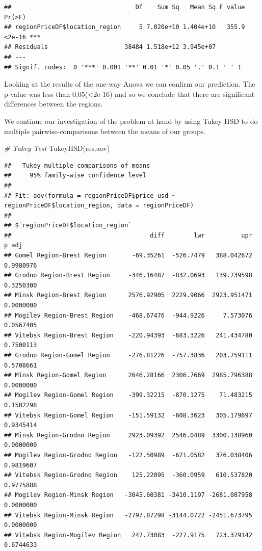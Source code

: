 \documentclass[
]{article}
\newenvironment{Shaded}{\begin{snugshade}}{\end{snugshade}}
\newcommand{\CommentTok}[1]{\textcolor[rgb]{0.56,0.35,0.01}{\textit{#1}}}
\newcommand{\FunctionTok}[1]{\textcolor[rgb]{0.00,0.00,0.00}{#1}}
\newcommand{\NormalTok}[1]{#1}
\begin{document}
\begin{verbatim}
##                                  Df    Sum Sq   Mean Sq F value Pr(>F)    
## regionPriceDF$location_region     5 7.020e+10 1.404e+10   355.9 <2e-16 ***
## Residuals                     38484 1.518e+12 3.945e+07                   
## ---
## Signif. codes:  0 '***' 0.001 '**' 0.01 '*' 0.05 '.' 0.1 ' ' 1
\end{verbatim}

Looking at the results of the one-way Anova we can confirm our
prediction. The p-value was less than 0.05(\textless2e-16) and so we
conclude that there are significant differences between the regions.

We continue our investigation of the problem at hand by using Tukey HSD
to do multiple pairwise-comparisons between the means of our groups.

\begin{Shaded}
\begin{Highlighting}[]
\CommentTok{\# Tukey Test}
\FunctionTok{TukeyHSD}\NormalTok{(res.aov)}
\end{Highlighting}
\end{Shaded}

\begin{verbatim}
##   Tukey multiple comparisons of means
##     95% family-wise confidence level
## 
## Fit: aov(formula = regionPriceDF$price_usd ~ regionPriceDF$location_region, data = regionPriceDF)
## 
## $`regionPriceDF$location_region`
##                                      diff        lwr          upr     p adj
## Gomel Region-Brest Region       -69.35261  -526.7479   388.042672 0.9980976
## Grodno Region-Brest Region     -346.16487  -832.0693   139.739598 0.3250300
## Minsk Region-Brest Region      2576.92905  2229.9066  2923.951471 0.0000000
## Mogilev Region-Brest Region    -468.67476  -944.9226     7.573076 0.0567405
## Vitebsk Region-Brest Region    -220.94393  -683.3226   241.434780 0.7500113
## Grodno Region-Gomel Region     -276.81226  -757.3836   203.759111 0.5708661
## Minsk Region-Gomel Region      2646.28166  2306.7669  2985.796388 0.0000000
## Mogilev Region-Gomel Region    -399.32215  -870.1275    71.483215 0.1502298
## Vitebsk Region-Gomel Region    -151.59132  -608.3623   305.179697 0.9345414
## Minsk Region-Grodno Region     2923.09392  2546.0489  3300.138960 0.0000000
## Mogilev Region-Grodno Region   -122.50989  -621.0582   376.038406 0.9819607
## Vitebsk Region-Grodno Region    125.22095  -360.0959   610.537820 0.9775888
## Mogilev Region-Minsk Region   -3045.60381 -3410.1197 -2681.087958 0.0000000
## Vitebsk Region-Minsk Region   -2797.87298 -3144.0722 -2451.673795 0.0000000
## Vitebsk Region-Mogilev Region   247.73083  -227.9175   723.379142 0.6744633
\end{verbatim}
\end{document}
